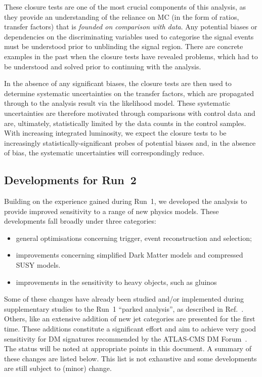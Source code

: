 These closure tests are one of the most crucial components of this
analysis, as they provide an understanding of the reliance on MC (in
the form of ratios, \ie transfer factors) that is {\it founded on
  comparison with data}. Any potential biases or dependencies on the
discriminating variables used to categorise the signal events must be
understood prior to unblinding the signal region. There are concrete
examples in the past when the closure tests have revealed problems,
which had to be understood and solved prior to continuing with the
analysis.

In the absence of any significant biases, the closure tests are then
used to determine systematic uncertainties on the transfer factors,
which are propagated through to the analysis result via the likelihood
model. These systematic uncertainties are therefore motivated through
comparisons with control data and are, ultimately, statistically
limited by the data counts in the control samples. With increasing
integrated luminosity, we expect the closure tests to be increasingly
statistically-significant probes of potential biases and, in the
absence of bias, the systematic uncertainties will correspondingly
reduce.

\subsection{Developments for Run~2}
\label{sec:changes}

Building on the experience gained during Run~1, we developed the
analysis to provide improved sensitivity to a range of new physics
models. These developments fall broadly under three categories:

\begin{itemize}
\item general optimisations concerning trigger, event reconstruction and
  selection;
\item improvements concerning simplified Dark Matter models and compressed SUSY
  models. 
\item improvements in the sensitivity to heavy objects, such as gluinos 
\end{itemize}

Some of these changes have already been studied and/or implemented
during supplementary studies to the Run~1 ``parked analysis'', as
described in Ref.~\cite{CMS_AN_2013-366}. Others, like an extensive addition of new
jet categories are presented for the first time. These additions constitute a significant effort and aim to achieve very good 
sensitivity for DM signatures recommended by the ATLAS-CMS DM Forum~\cite{Abercrombie:2015wmb}.
The status will be noted at appropriate points in this document. A summary of these changes are
listed below. This list is not exhaustive and some developments are
still subject to (minor) change.

